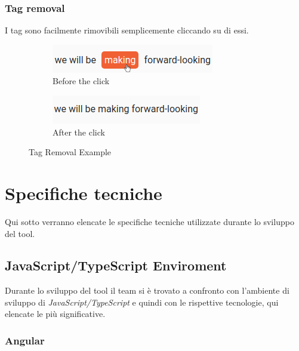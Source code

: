 \documentclass[twoside]{supsistudent}
\begin{document}
\subsection{Tag removal}

I tag sono facilmente rimovibili semplicemente cliccando su di essi.

\begin{figure}[h!]
  \centering
  \begin{subfigure}[b]{0.4\linewidth}
    \includegraphics[width=\linewidth]{figures/tagRemoval1.png}
    \caption{Before the click}
  \end{subfigure}
  \begin{subfigure}[b]{0.4\linewidth}
    \includegraphics[width=\linewidth]{figures/tagRemoval2.png}
    \caption{After the click}
  \end{subfigure}
  \caption{Tag Removal Example}
  \label{fig:tagRemoval}
\end{figure}

\chapter{Specifiche tecniche}

Qui sotto verranno elencate le specifiche tecniche utilizzate durante lo
sviluppo del tool.

\section{JavaScript/TypeScript Enviroment}

Durante lo sviluppo del tool il team si è trovato a confronto con l'ambiente
di sviluppo di \textit{JavaScript/TypeScript} e quindi con le rispettive 
tecnologie, qui elencate le più significative.

\subsection{Angular}
\end{document}
